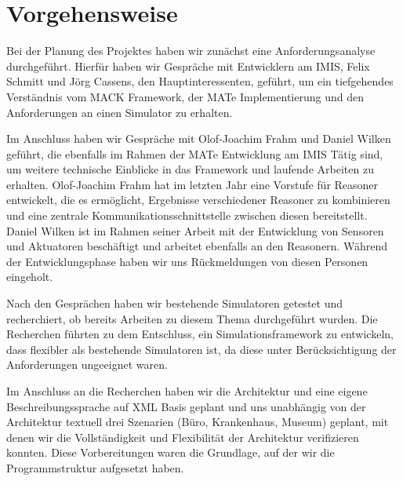 

\section{Vorgehensweise}\label{sec:approach}
Bei der Planung des Projektes haben wir zunächst eine Anforderungsanalyse durchgeführt. Hierfür haben wir Gespräche mit Entwicklern am IMIS, Felix Schmitt und Jörg Cassens, den Hauptinteressenten, geführt, um ein tiefgehendes Verständnis vom MACK Framework, der MATe Implementierung und den Anforderungen an einen Simulator zu erhalten.

Im Anschluss haben wir Gespräche mit Olof-Joachim Frahm und Daniel Wilken geführt, die ebenfalls im Rahmen der MATe Entwicklung am IMIS Tätig sind, um weitere technische Einblicke in das Framework und laufende Arbeiten zu erhalten. Olof-Joachim Frahm hat im letzten Jahr eine Vorstufe für Reasoner entwickelt, die es ermöglicht, Ergebnisse verschiedener Reasoner zu kombinieren und eine zentrale Kommunikationsschnittstelle zwischen diesen bereitstellt. Daniel Wilken ist im Rahmen seiner Arbeit mit der Entwicklung von Sensoren und Aktuatoren beschäftigt und arbeitet ebenfalls an den Reasonern. Während der Entwicklungsphase haben wir uns Rückmeldungen von diesen Personen eingeholt.

Nach den Gesprächen haben wir bestehende Simulatoren getestet und recherchiert, ob bereits Arbeiten zu diesem Thema durchgeführt wurden. Die Recherchen führten zu dem Entschluss, ein Simulationsframework zu entwickeln, dass flexibler als bestehende Simulatoren ist, da diese unter Berücksichtigung der Anforderungen ungeeignet waren.

Im Anschluss an die Recherchen haben wir die Architektur und eine eigene Beschreibungssprache auf XML Basis geplant und uns unabhängig von der Architektur textuell drei Szenarien (Büro, Krankenhaus, Museum) geplant, mit denen wir die Vollständigkeit und Flexibilität der Architektur verifizieren konnten. Diese Vorbereitungen waren die Grundlage, auf der wir die Programmstruktur aufgesetzt haben.

